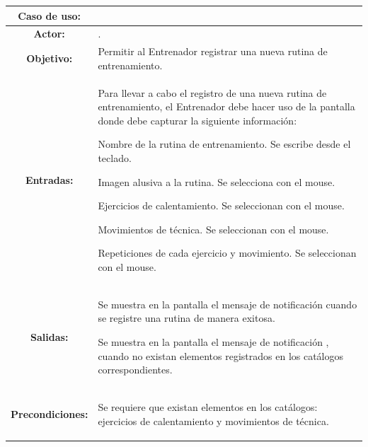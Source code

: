 \begin{table}[H]
\centering
\begin{tabular}{| c | p{12 cm} |}
\hline
\rowcolor[rgb]{0.529412, 0.807843, 0.980392} {\textbf{Caso de uso:}} & \hspace{7em}{\textbf{CUE03.1 Registrar rutina}}\\
\hline
\textbf{Actor:} &  \nameref{act:Entrenador}. \\
\hline
\textbf{Objetivo:} & Permitir al Entrenador registrar una nueva rutina de entrenamiento.\\
\hline
\textbf{Entradas:} & Para llevar a cabo el registro de una nueva rutina de entrenamiento, el Entrenador debe hacer uso de la pantalla \nameref{pant:IUE03.1} donde debe capturar la siguiente información:
	\begin{compactitem} 
			\setlength\itemsep{-0.25em}
			\item Nombre de la rutina de entrenamiento. Se escribe desde el teclado.
			\item Imagen alusiva a la rutina. Se selecciona con el mouse.
			\item Ejercicios de calentamiento. Se seleccionan con el mouse.
			\item Movimientos de técnica. Se seleccionan con el mouse.
			\item Repeticiones de cada ejercicio y movimiento. Se seleccionan con el mouse.
	\end{compactitem} \\
\hline
\textbf{Salidas:} & \vspace{-2mm}	%
					\begin{compactitem}
						\setlength\itemsep{-0.25em}
						\item Se muestra en la pantalla \nameref{pant:IUE03.1} el mensaje de notificación \nameref{msj:MSG01} cuando se registre una rutina de manera exitosa.
						\item Se muestra en la pantalla \nameref{pant:IUE03} el mensaje de notificación \nameref{msj:MSG02}, cuando no existan elementos registrados en los catálogos correspondientes.
					\end{compactitem}\\
\hline
\textbf{Precondiciones:} & \vspace{-2mm}	%
							\begin{compactitem}
								\setlength\itemsep{-0.25em}
								\item Se requiere que existan elementos en los catálogos: ejercicios de calentamiento y movimientos de técnica.

\end{compactitem}
\end{tabular}
\end{table}
